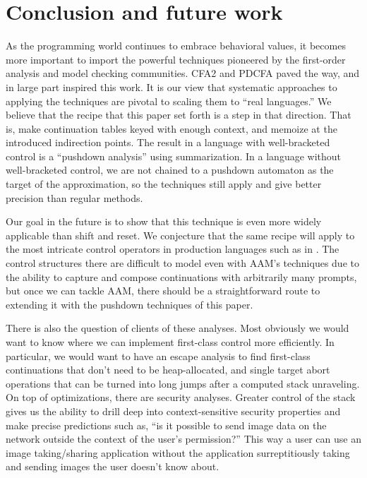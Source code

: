 \documentclass{llncs}
\begin{document}
\section{Conclusion and future work}

As the programming world continues to embrace behavioral values, it
becomes more important to import the powerful techniques pioneered by
the first-order analysis and model checking communities. CFA2 and
PDCFA paved the way, and in large part inspired this work. It is our
view that systematic approaches to applying the techniques are pivotal
to scaling them to ``real languages.'' We believe that the recipe that
this paper set forth is a step in that direction. That is, make
continuation tables keyed with enough context, and memoize at the
introduced indirection points. The result in a language with
well-bracketed control is a ``pushdown analysis'' using
summarization. In a language without well-bracketed control, we are
not chained to a pushdown automaton as the target of the
approximation, so the techniques still apply and give better precision
than regular methods.

Our goal in the future is to show that this technique is even more
widely applicable than shift and reset. We conjecture that the same
recipe will apply to the most intricate control operators in
production languages such as in
\citet{ianjohnson:Flatt:2007:ADC:1291151.1291178}. The control
structures there are difficult to model even with AAM's techniques due
to the ability to capture and compose continuations with arbitrarily many prompts,
but once we can tackle AAM, there should be a straightforward route to
extending it with the pushdown techniques of this paper.

There is also the question of clients of these analyses. Most
obviously we would want to know where we can implement first-class
control more efficiently. In particular, we would want to have an
escape analysis to find first-class continuations that don't need to
be heap-allocated, and single target abort operations that can be
turned into long jumps after a computed stack unraveling. On top of
optimizations, there are security analyses. Greater control of the
stack gives us the ability to drill deep into context-sensitive
security properties and make precise predictions such as, ``is it
possible to send image data on the network outside the context of the
user's permission?'' This way a user can use an image taking/sharing
application without the application surreptitiously taking and sending
images the user doesn't know about.



\end{document}
